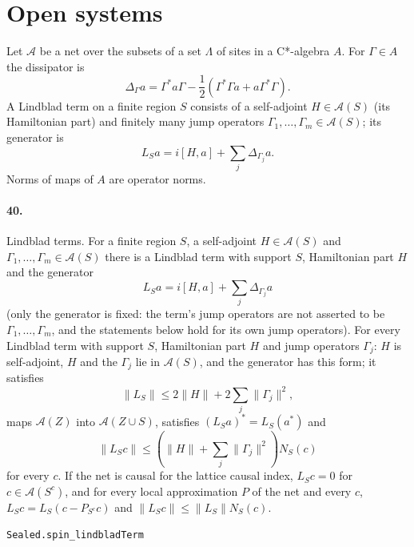 \documentclass[11pt]{article}
\begin{document}
\section*{Open systems}
Let $\mathcal A$ be a net over the subsets of a set $\Lambda$ of sites in a C*-algebra $A$. For $\Gamma \in A$ the dissipator is \[\Delta_\Gamma a = \Gamma^* a \Gamma - \frac12 (\Gamma^* \Gamma a + a \Gamma^* \Gamma).\] A Lindblad term on a finite region $S$ consists of a self-adjoint $H \in \mathcal A(S)$ (its Hamiltonian part) and finitely many jump operators $\Gamma_1, \dots, \Gamma_m \in \mathcal A(S)$; its generator is \[L_S a = i[H, a] + \sum_j \Delta_{\Gamma_j} a.\] Norms of maps of $A$ are operator norms.

\paragraph{40.} Lindblad terms. For a finite region $S$, a self-adjoint $H \in \mathcal A(S)$ and $\Gamma_1, \dots, \Gamma_m \in \mathcal A(S)$ there is a Lindblad term with support $S$, Hamiltonian part $H$ and the generator \[L_S a = i[H, a] + \sum_j \Delta_{\Gamma_j} a\] (only the generator is fixed: the term's jump operators are not asserted to be $\Gamma_1, \dots, \Gamma_m$, and the statements below hold for its own jump operators). For every Lindblad term with support $S$, Hamiltonian part $H$ and jump operators $\Gamma_j$: $H$ is self-adjoint, $H$ and the $\Gamma_j$ lie in $\mathcal A(S)$, and the generator has this form; it satisfies \[\|L_S\| \le 2\|H\| + 2\sum_j \|\Gamma_j\|^2,\] maps $\mathcal A(Z)$ into $\mathcal A(Z \cup S)$, satisfies $(L_S a)^* = L_S(a^*)$ and \[\|L_S c\| \le (\|H\| + \sum_j \|\Gamma_j\|^2) N_S(c)\] for every $c$. If the net is causal for the lattice causal index, $L_S c = 0$ for $c \in \mathcal A(S^c)$, and for every local approximation $P$ of the net and every $c$, $L_S c = L_S(c - P_{S^c} c)$ and $\|L_S c\| \le \|L_S\| N_S(c)$.\par{\footnotesize\texttt{Sealed.spin\_lindbladTerm}}
\end{document}
